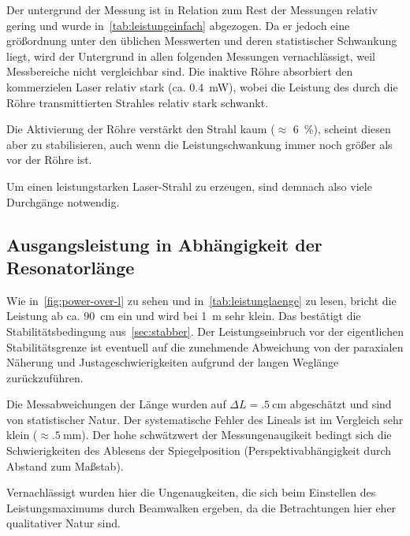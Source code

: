 \documentclass[slug=GL, room=HZDR\ Dresden/Rossendorf\,\ Geb.\ 620/123, supervisor=Tim\ Ziegler]{../../Lab_Report_LaTeX/lab_report}
\begin{document}
Der untergrund der Messung ist in Relation zum Rest der Messungen
relativ gering und wurde in~\ref{tab:leistungeinfach} abgezogen. Da
er jedoch eine gr\"o\ss{}ordnung unter den \"ublichen Messwerten und
deren statistischer Schwankung liegt, wird der Untergrund in allen
folgenden Messungen vernachl\"assigt, weil Messbereiche nicht
vergleichbar sind.
Die inaktive R\"ohre absorbiert den kommerzielen Laser relativ stark
(ca. \SI{0.4}{\milli\watt}), wobei die Leistung des durch die R\"ohre
transmittierten Strahles relativ stark schwankt.

Die Aktivierung der R\"ohre verst\"arkt den Strahl kaum (\(\approx\)
\SI{6}{\percent}), scheint diesen aber zu stabilisieren, auch wenn die
Leistungschwankung immer noch gr\"o\ss{}er als vor der R\"ohre ist.

Um einen leistungstarken Laser-Strahl zu erzeugen, sind demnach also
viele Durchg\"ange notwendig.

\subsection{Ausgangsleistung in Abh\"angigkeit der Resonatorl\"ange}

Wie in~\ref{fig:power-over-l} zu sehen und in~\ref{tab:leistunglaenge}
zu lesen, bricht die Leistung ab
ca. \SI{90}{\centi\meter} ein und wird bei \SI{1}{\meter} sehr klein.
Das best\"atigt die Stabilit\"atsbedingung aus~\ref{sec:stabber}. Der
Leistungseinbruch vor der eigentlichen Stabilit\"atsgrenze ist
eventuell auf die zunehmende Abweichung von der paraxialen N\"aherung
und Justageschwierigkeiten aufgrund der langen Wegl\"ange
zur\"uckzuf\"uhren.

Die Messabweichungen der L\"ange wurden auf \(\Delta L = \SI{.5}{\centi\meter}\)
abgesch\"atzt und sind von statistischer Natur. Der systematische
Fehler des Lineals ist im Vergleich sehr klein (\(\approx
\SI{.5}{\milli\meter}\)). Der hohe schw\"atzwert der Messungenaugikeit
bedingt sich die Schwierigkeiten des Ablesens der Spiegelposition
(Perspektivabh\"angigkeit durch Abstand zum Ma\ss{}stab).


Vernachl\"assigt wurden hier die Ungenaugkeiten, die sich beim
Einstellen des Leistungsmaximums durch Beamwalken ergeben, da die
Betrachtungen hier eher qualitativer Natur sind.
\end{document}
